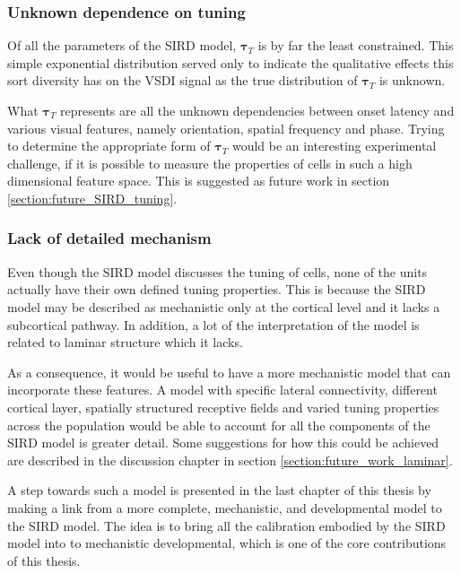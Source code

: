 \documentclass[phd,ianc,twoside]{infthesis}
\begin{document}

\subsubsection*{Unknown dependence on tuning}
\label{section:unknown_tauT}

Of all the parameters of the SIRD model, $\pmb{\tau}_T$ is by far the
least constrained. This simple exponential distribution served only to
indicate the qualitative effects this sort diversity has on the VSDI
signal as the true distribution of $\pmb{\tau}_T$ is unknown.

What $\pmb{\tau}_T$ represents are all the unknown dependencies between
onset latency and various visual features, namely orientation, spatial
frequency and phase. Trying to determine the appropriate form of
$\pmb{\tau}_T$ would be an interesting experimental challenge, if it is
possible to measure the properties of cells in such a high dimensional
feature space. This is suggested as future work in section
\ref{section:future_SIRD_tuning}.

\subsubsection*{Lack of detailed mechanism}
\label{section:lack_of_mechanism}

Even though the SIRD model discusses the tuning of cells, none of the
units actually have their own defined tuning properties. This is because
the SIRD model may be described as mechanistic only at the cortical
level and it lacks a subcortical pathway. In addition, a lot of the
interpretation of the model is related to laminar structure which it
lacks.

As a consequence, it would be useful to have a more mechanistic model
that can incorporate these features. A model with specific lateral
connectivity, different cortical layer, spatially structured receptive
fields and varied tuning properties across the population would be able
to account for all the components of the SIRD model is greater detail.
Some suggestions for how this could be achieved are described in the
discussion chapter in section \ref{section:future_work_laminar}.

A step towards such a model is presented in the last chapter of this
thesis by making a link from a more complete, mechanistic, and
developmental model to the SIRD model. The idea is to bring all the
calibration embodied by the SIRD model into to mechanistic
developmental, which is one of the core contributions of this thesis.
\end{document}
